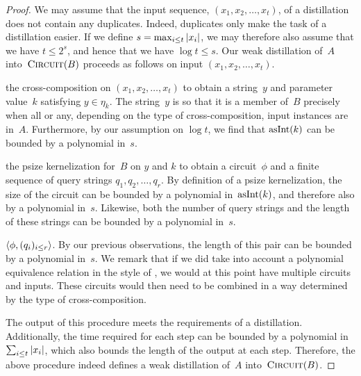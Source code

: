\begin{proof}
  We may assume that the input sequence, $(x_1, x_2, \ldots, x_t)$, of a distillation does not contain any duplicates.
  Indeed, duplicates only make the task of a distillation easier.
  If we define $s = \max_{i \le t} {\lvert x_i\rvert}$, we may therefore also assume that we have $t \le 2^s$, and hence that we have $\log t \le s$.
  Our weak distillation of~$A$ into~$\textnormal{\textsc{Circuit}}(B)$ proceeds as follows on input $(x_1, x_2, \ldots, x_t)$.
  \begin{codelisting}
  \item
     the cross-composition on $(x_1, x_2, \ldots, x_t)$ to obtain a string~$y$ and parameter value~$k$ satisfying $y \in \eta_k$.
    The string~$y$ is so that it is a member of~$B$ precisely when all or any, depending on the type of cross-composition, input instances are in~$A$.
    Furthermore, by our assumption on $\log t$, we find that $\asNat(k)$ can be bounded by a polynomial in~$s$.
  \item
     the psize kernelization for~$B$ on $y$ and $k$ to obtain a circuit~$\phi$ and a finite sequence of query strings $q_1, q_2, \ldots, q_r$.
    By definition of a psize kernelization, the size of the circuit can be bounded by a polynomial in~$\asNat(k)$, and therefore also by a polynomial in~$s$.
    Likewise, both the number of query strings and the length of these strings can be bounded by a polynomial in~$s$.
  \item
     $\pair{\phi}{(q_i)_{i \le r}}$.
    By our previous observations, the length of this pair can be bounded by a polynomial in~$s$.
    We remark that if we did take into account a polynomial equivalence relation in the style of \textcite{bodlaender2014kernelization}, we would at this point have multiple circuits and inputs.
    These circuits would then need to be combined in a way determined by the type of cross-composition.
  \end{codelisting}

  The output of this procedure meets the requirements of a distillation.
  Additionally, the time required for each step can be bounded by a polynomial in $\sum_{i \le t} {\lvert x_i\rvert}$, which also bounds the length of the output at each step.
  Therefore, the above procedure indeed defines a weak distillation of~$A$ into~$\textnormal{\textsc{Circuit}}(B)$.
\end{proof}

